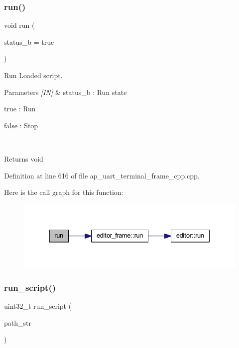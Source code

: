 \subsubsection{run()}
{\footnotesize\ttfamily void run (\begin{DoxyParamCaption}\item[{bool}]{status\+\_\+b = {\ttfamily true} }\end{DoxyParamCaption})}



Run Loaded script. 


\begin{DoxyParams}{Parameters}
{\em \mbox{[}\+I\+N\mbox{]}} & status\+\_\+b \+: Run state \begin{DoxyItemize}
\item true \+: Run \item false \+: Stop \end{DoxyItemize}
\\
\hline
\end{DoxyParams}
\begin{DoxyReturn}{Returns}
void 
\end{DoxyReturn}


Definition at line 616 of file ap\+\_\+uart\+\_\+terminal\+\_\+frame\+\_\+cpp.\+cpp.

Here is the call graph for this function\+:
\nopagebreak
\begin{figure}[H]
\begin{center}
\leavevmode
\includegraphics[width=331pt]{group___u_a_r_t__terminal_ga814ef6f49245db963f3faefc8ac98efb_cgraph}
\end{center}
\end{figure}
\mbox{\label{group___u_a_r_t__terminal_ga5ad6770a94d4fba50b27ae366ba4580d}} 
\subsubsection{run\_script()}
{\footnotesize\ttfamily uint32\+\_\+t run\+\_\+script (\begin{DoxyParamCaption}\item[{wx\+String}]{path\+\_\+str }\end{DoxyParamCaption})}



